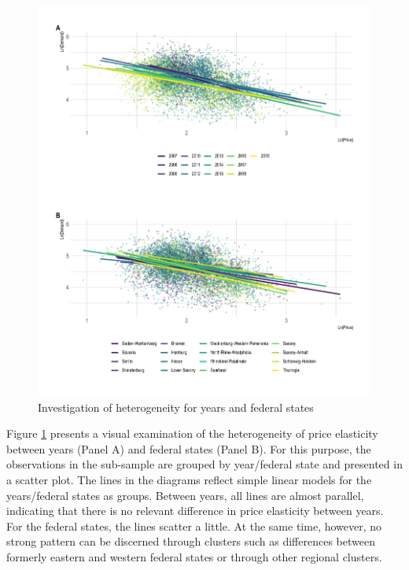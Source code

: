 \documentclass[12pt,twoside]{reedthesis}
\begin{document}
\newpage
\begin{figure}

{\centering \includegraphics[width=1\linewidth]{figure/year_state_heterogeneity_plot} 

}

\caption{Investigation of heterogeneity for years and federal states}\label{fig:heterogeneity-year-state-plot}
\end{figure}
\noindent
Figure \ref{fig:heterogeneity-year-state-plot} presents a visual examination of the heterogeneity of price elasticity between years (Panel A) and federal states (Panel B). For this purpose, the observations in the sub-sample are grouped by year/federal state and presented in a scatter plot. The lines in the diagrams reflect simple linear models for the years/federal states as groups. Between years, all lines are almost parallel, indicating that there is no relevant difference in price elasticity between years. For the federal states, the lines scatter a little. At the same time, however, no strong pattern can be discerned through clusters such as differences between formerly eastern and western federal states or through other regional clusters.
\end{document}
